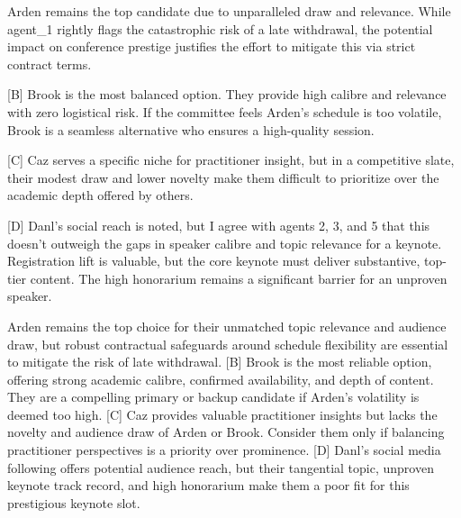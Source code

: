 \begin{tcolorbox}[mbox-neutral={agent\_4 -- discussion r2}]
[A] Arden remains the top candidate due to unparalleled draw and relevance. While agent\_1 rightly flags the catastrophic risk of a late withdrawal, the potential impact on conference prestige justifies the effort to mitigate this via strict contract terms.

[B] Brook is the most balanced option. They provide high calibre and relevance with zero logistical risk. If the committee feels Arden's schedule is too volatile, Brook is a seamless alternative who ensures a high-quality session.

[C] Caz serves a specific niche for practitioner insight, but in a competitive slate, their modest draw and lower novelty make them difficult to prioritize over the academic depth offered by others.

[D] Danl's social reach is noted, but I agree with agents 2, 3, and 5 that this doesn't outweigh the gaps in speaker calibre and topic relevance for a keynote. Registration lift is valuable, but the core keynote must deliver substantive, top-tier content. The high honorarium remains a significant barrier for an unproven speaker.
\end{tcolorbox}

\begin{tcolorbox}[mbox-neutral={agent\_5 -- discussion r2}]
[A] Arden remains the top choice for their unmatched topic relevance and audience draw, but robust contractual safeguards around schedule flexibility are essential to mitigate the risk of late withdrawal.  
[B] Brook is the most reliable option, offering strong academic calibre, confirmed availability, and depth of content. They are a compelling primary or backup candidate if Arden's volatility is deemed too high.  
[C] Caz provides valuable practitioner insights but lacks the novelty and audience draw of Arden or Brook. Consider them only if balancing practitioner perspectives is a priority over prominence.  
[D] Danl's social media following offers potential audience reach, but their tangential topic, unproven keynote track record, and high honorarium make them a poor fit for this prestigious keynote slot.
\end{tcolorbox}

